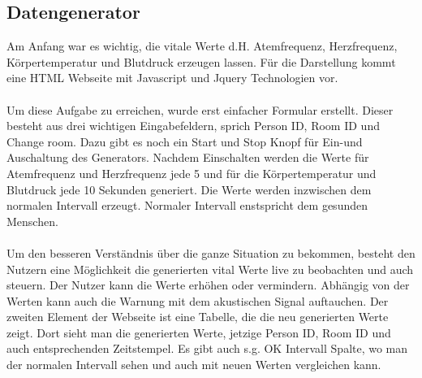\subsection{Datengenerator}
Am Anfang war es wichtig, die vitale Werte d.H. Atemfrequenz, Herzfrequenz, Körpertemperatur und Blutdruck erzeugen lassen. Für die Darstellung kommt eine HTML Webseite mit Javascript und Jquery Technologien vor.
\\
\\
Um diese Aufgabe zu erreichen, wurde erst einfacher Formular erstellt.
Dieser besteht aus drei wichtigen Eingabefeldern, sprich Person ID, Room ID und Change room. Dazu gibt es noch ein Start und Stop Knopf für Ein-und Auschaltung des Generators. 
Nachdem Einschalten werden die Werte für Atemfrequenz und Herzfrequenz jede 5 und für die Körpertemperatur und Blutdruck jede 10 Sekunden generiert. Die Werte werden inzwischen dem normalen Intervall erzeugt. Normaler Intervall enstspricht dem gesunden Menschen.
\\
\\
Um den besseren Verständnis über die ganze Situation zu bekommen, besteht den Nutzern eine Möglichkeit die generierten vital Werte live zu beobachten und auch steuern. Der Nutzer kann die Werte erhöhen oder vermindern. Abhängig von der Werten kann auch die Warnung mit dem akustischen Signal auftauchen. 
Der zweiten Element der Webseite ist eine Tabelle, die die neu generierten Werte zeigt. Dort sieht man die generierten Werte, jetzige Person ID, Room ID und auch entsprechenden Zeitstempel. Es gibt auch s.g. OK Intervall Spalte, wo man der normalen Intervall sehen und auch mit neuen Werten vergleichen kann.